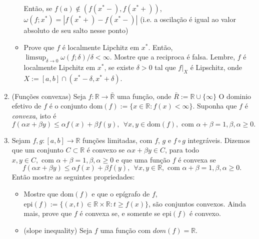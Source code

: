 \documentclass{article}
\theoremstyle{plain}
\theoremstyle{definition}
\theoremstyle{remark}
\newcommand{\R}{{\mathbb R}}
\begin{document}
\begin{enumerate}
\begin{itemize}
  Então, se $f(a) \notin (f(x^*-), f(x^*+))$, 
  $\omega(f;x^*)=|f(x^{*}+)-f(x^{*}-)|$ (i.e. a oscilação é igual ao valor 
  absoluto de seu salto nesse ponto) 
  \item Prove que $f$ é localmente Lipchitz em $x^{*}$. Então,  
  $\limsup_{\delta \rightarrow 0} \omega(f;\delta)/\delta <\infty$.
  Mostre que a reciproca é falsa. Lembre, $f$ é localmente Lipchitz em $x^{*}$, se existe $\delta>0$ tal que $\left.f\right|_X$ é Lipschitz, onde $X:=[a,b]\cap (x^{*}-\delta, x^{*}+\delta)$. 
  \end{itemize}
  \item (Funções convexas)
  Seja $f: \mathbb{R} \rightarrow \bar{\R}$ uma função, onde 
  $\bar{R}:=\R \cup \{\infty\}$ O  dominio efetivo de $f$ é o conjunto
   $\text{dom}(f):=\{x \in \R: f(x)<\infty \}$.
  Suponha que  $f$ é {\it convexa}, isto é  
    $$f(\alpha x+ \beta y)\leq \alpha f(x)+\beta f(y), \ \ 
  \forall x, y \in \text{dom}(f), \text{ com } 
  \alpha+\beta=1, \beta, \alpha\geq0.$$  
  \item   Sejam $f,g:[a,b] \rightarrow \mathbb{R}$ funções limitadas, com 
  $f$, $g$ e $f \circ g$ integráveis. 
  Dizemos que um conjunto $C \subset \R$ é convexo se 
  $\alpha x+ \beta y \in C$, para todo $x, y \in C, \text{ com } 
  \alpha+\beta=1, \beta, \alpha\geq0$ e que 
  uma função $f$ é convexa se   
    $$f(\alpha x+ \beta y)\leq \alpha f(x)+\beta f(y), \ \ 
  \forall x, y \in \mathbb{R}, \text{ com } 
  \alpha+\beta=1, \beta, \alpha\geq0.$$ 
  Então mostre as seguintes propriedades: 
   \begin{itemize}
   \item Mostre que $\text{dom}(f)$ e que o epígrafo de $f$, 
   $\text{epi}(f):=\{(x, t) \in \R\times \R: t \geq f(x)\}$, 
   são conjuntos convexos. Ainda mais, prove que $f$
   é convexa se, e somente se  $\text{epi}(f)$ é convexo.
   \item (slope inequality) Seja $f$ uma função com
   $dom(f)=\R$.
   

\end{itemize}
\end{enumerate}
\end{document}
